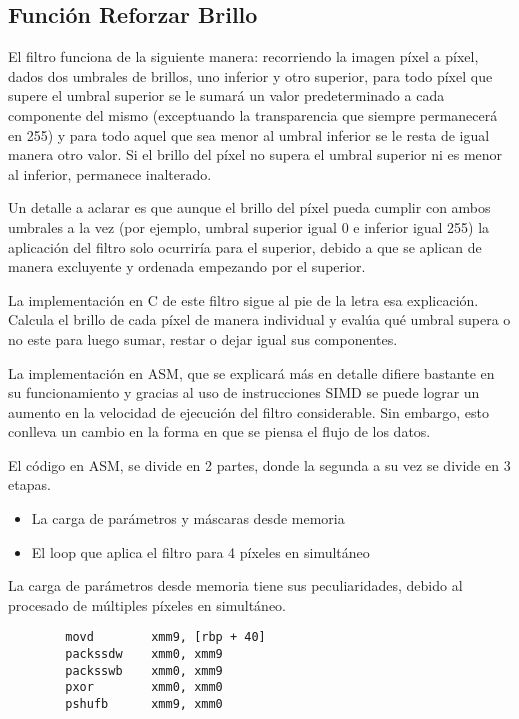 \subsection{Función Reforzar Brillo}

\par El filtro funciona de la siguiente manera: recorriendo la imagen píxel a píxel, dados dos umbrales de brillos, uno inferior y otro superior,
para todo píxel que supere el umbral superior se le sumará un valor predeterminado a cada componente
del mismo (exceptuando la transparencia que siempre permanecerá en 255) y para todo aquel que sea menor al umbral inferior se le resta de igual manera otro valor. Si el brillo del píxel no supera el umbral superior ni es menor al inferior, permanece inalterado.
\par Un detalle a aclarar es que aunque el brillo del píxel pueda cumplir con ambos umbrales a la vez (por ejemplo, umbral superior igual 0 e inferior igual 255) la aplicación del filtro solo ocurriría para el superior, debido a que se aplican de manera excluyente y ordenada empezando por el superior.
\par La implementación en C de este filtro sigue al pie de la letra esa explicación.
Calcula el brillo de cada píxel de manera individual y evalúa qué umbral supera o no este para luego sumar, restar o dejar igual sus componentes.

\par La implementación en ASM, que se explicará más en detalle difiere bastante en su funcionamiento y gracias al uso de instrucciones SIMD se puede lograr un
aumento en la velocidad de ejecución del filtro considerable. Sin embargo, esto conlleva un cambio en la forma en que se piensa el flujo de los datos.
\par El código en ASM, se divide en 2 partes, donde la segunda a su vez se divide en 3 etapas.
\begin{itemize}
        \item La carga de parámetros y máscaras desde memoria
        \item El loop que aplica el filtro para 4 píxeles en simultáneo
\end{itemize}
La carga de parámetros desde memoria tiene sus peculiaridades, debido al procesado de múltiples píxeles en simultáneo.
\begin{codesnippet}
        \begin{verbatim}
        movd        xmm9, [rbp + 40]
        packssdw    xmm0, xmm9
        packsswb    xmm0, xmm9
        pxor        xmm0, xmm0
        pshufb      xmm9, xmm0
	\end{verbatim}
\end{codesnippet}

